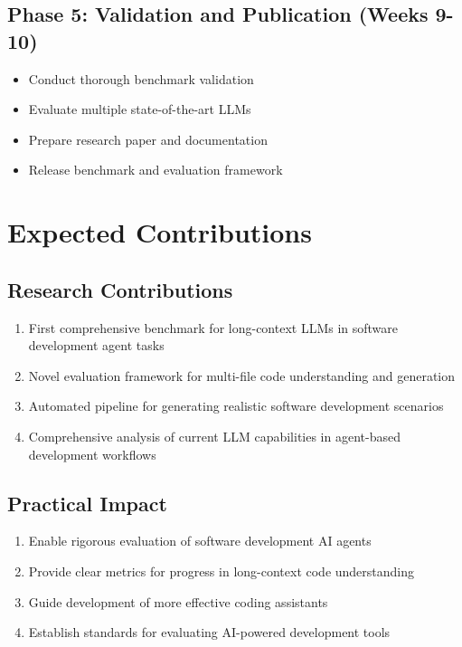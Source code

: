 \documentclass{article}
\begin{document}
\subsection{Phase 5: Validation and Publication (Weeks 9-10)}
\begin{itemize}
    \item Conduct thorough benchmark validation
    \item Evaluate multiple state-of-the-art LLMs
    \item Prepare research paper and documentation
    \item Release benchmark and evaluation framework
\end{itemize}

\section{Expected Contributions}

\subsection{Research Contributions}
\begin{enumerate}
    \item First comprehensive benchmark for long-context LLMs in software development agent tasks
    \item Novel evaluation framework for multi-file code understanding and generation
    \item Automated pipeline for generating realistic software development scenarios
    \item Comprehensive analysis of current LLM capabilities in agent-based development workflows
\end{enumerate}

\subsection{Practical Impact}
\begin{enumerate}
    \item Enable rigorous evaluation of software development AI agents
    \item Provide clear metrics for progress in long-context code understanding
    \item Guide development of more effective coding assistants
    \item Establish standards for evaluating AI-powered development tools
\end{enumerate}
\end{document}
